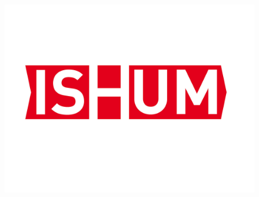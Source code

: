 




%
%

\begin{titlepage}
\begin{figure}
	\centering
    \begin{minipage}{0.28\textwidth}
        \begin{flushleft}
            \includegraphics[scale=0.23]{csm_ISUM_Logo_Final_107dd2fa79.jpg}
        \end{flushleft}
    \end{minipage}
    \begin{minipage}{0.35\textwidth}
        \centering
        \hspace{0.25cm}
    \end{minipage}
    \begin{minipage}{0.25\textwidth}
        \begin{flushright}

\end{flushright}
\end{minipage}
\end{figure}
\end{titlepage}
